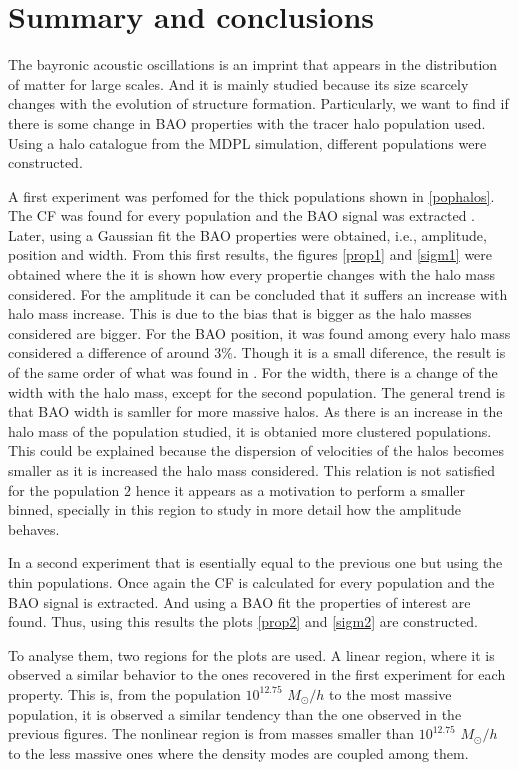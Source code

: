 \chapter{Summary and conclusions}


The bayronic acoustic oscillations is an imprint that appears in the distribution of matter 
for large scales. And it is mainly studied because its size scarcely changes with the evolution of
structure formation. Particularly, we want to find if there is some change in BAO properties with 
the tracer halo population used.
Using a halo catalogue from the MDPL simulation, different populations were 
constructed. 

A first experiment was perfomed for the thick populations shown in \ref{pophalos}.
The CF was found for every population and the BAO signal was extracted . 
Later, using a Gaussian fit the BAO properties were obtained, i.e., amplitude, position 
and width. 
From this first results, the figures \ref{prop1} and \ref{sigm1} were obtained where
the it is shown how every propertie changes with the halo mass considered. 
For the amplitude it can be concluded that it suffers an increase
with halo mass increase. This is due to the bias that is bigger as the halo masses considered
are bigger. 
For the BAO position, it was found among every halo mass considered a difference of around $3\%$.
Though it is a small diference, the result is of the same order of what was found in 
\cite{motion}. 
For the width, there is a change of the width with the halo mass, except for the second 
population. The general trend is that BAO width is samller for more massive halos. As there is an increase in the halo mass of the population studied, it is obtanied
more clustered populations. This could be explained because the dispersion of velocities of
the halos becomes smaller as it is increased the halo mass considered. 
This relation is not satisfied for the population $2$	 hence it appears as a motivation to
perform a smaller binned, specially in this region to study in more detail how the 
amplitude behaves.
	
		
In a second experiment that is esentially equal to the previous one but using the 
thin populations. 
Once again the CF is calculated for every population and the BAO signal is extracted. 
And using a BAO fit the properties of interest are found. Thus, using this results the 
plots \ref{prop2} and \ref{sigm2} are constructed. 

To analyse them, two regions for the plots are used. A linear region, where it is observed
a similar behavior to the ones recovered in the first experiment for each property. This is, 
from the population $10^{12.75}$ $M_{\odot}/h$ to the most massive population, it is observed a similar 
tendency than the one observed in the previous figures. 
The nonlinear region is from masses smaller than $10^{12.75}$ $M_{\odot}/h$ to the less massive ones where
the density modes are coupled among them. 

